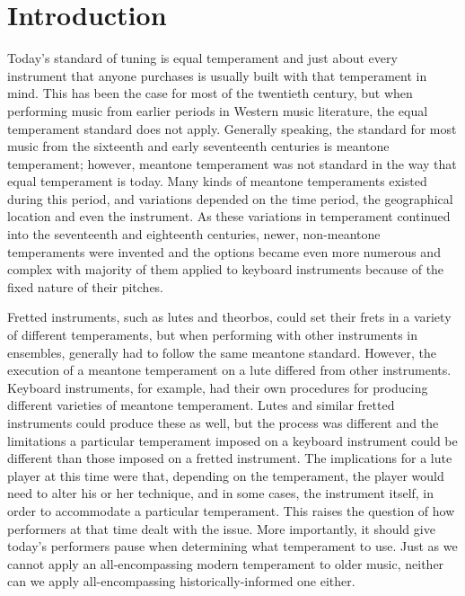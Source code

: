 \chapter*{Introduction}

Today's standard of tuning is equal temperament and just about every instrument that
anyone purchases is usually built with that temperament in mind.  This has been the
case for most of the twentieth century, but when performing music from earlier periods
in Western music literature, the equal temperament standard does not apply.  Generally
speaking, the standard for most music from the sixteenth and early seventeenth
centuries is meantone temperament; however, meantone temperament
was not standard in the way that equal temperament is today.  Many
kinds of meantone temperaments existed during this period, and variations
depended on the time period, the geographical
location and even the instrument.  As these variations in temperament continued into
the seventeenth and eighteenth centuries, newer, non-meantone temperaments were
invented and the options became even more numerous and complex with majority of them
applied to keyboard instruments because of the fixed nature of their pitches.

Fretted instruments, such as lutes and theorbos, could set their frets in a
variety of different temperaments, but when performing with other instruments in
ensembles, generally had to follow the same meantone standard.  However, the
execution of a meantone temperament on a lute differed from other instruments.
Keyboard instruments, for example, had their own procedures for producing
different varieties of meantone temperament.  Lutes and similar fretted
instruments could produce these as well, but the process was different and the
limitations a particular temperament imposed on a keyboard instrument could be
different than those imposed on a fretted instrument.  The implications for a
lute player at this time were that, depending on the temperament, the player
would need to alter his or her technique, and in some cases, the instrument
itself, in order to accommodate a particular temperament. This raises the
question of how performers at that time dealt with the issue.  More importantly,
it should give today's performers pause when determining what temperament to
use.  Just as we cannot apply an all-encompassing modern temperament to older
music, neither can we apply all-encompassing historically-informed one either.

